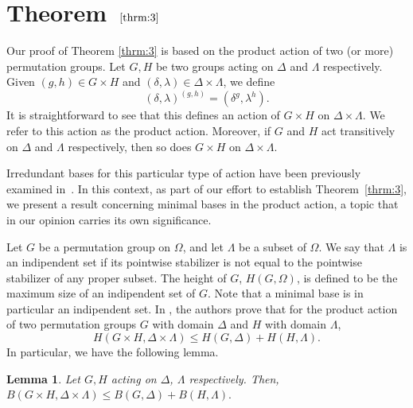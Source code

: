 \documentclass{amsart}
\newtheorem{lemma}[theorem]{Lemma}
\begin{document}
	\section{Theorem~$\ref{thrm:3}$} \label{SectionThmMinBase}
	Our proof of Theorem \ref{thrm:3} is based on the product action of two (or more) permutation groups. 
	Let $G, H$ be two groups acting on $\Delta$ and $\Lambda$ respectively. Given $(g,h) \in G \times H$ and $(\delta, \lambda) \in \Delta \times \Lambda$, we define
	\[
		(\delta,\lambda)^{(g,h)} = (\delta^g, \lambda^h).
	\]
	It is straightforward to see that this defines an action of $G \times H$ on $\Delta \times \Lambda$. We refer to this action as the product action. Moreover, if $G$ and $H$ act transitively on $\Delta$ and $\Lambda$ respectively, then so does $G\times H$ on $\Delta \times \Lambda$. 
	
	
Irredundant bases for this particular type of action have been previously examined in~\cite{GLSp}. In this context, as part of our effort to establish Theorem~\ref{thrm:3}, we present a result concerning minimal bases in the product action, a topic that in our opinion carries its own significance.
	
	
	Let $G$ be a permutation group on $\Omega$, and let  $\Lambda$ be a subset of $\Omega$. We say that $\Lambda$ is an indipendent set if its pointwise stabilizer is not equal to the pointwise stabilizer of any proper subset. The height of $G$, $H(G,\Omega)$, is defined to be the maximum size of an indipendent set of $G$. Note that a minimal base is in particular an indipendent set. In \cite[Lemma 2.5]{GLSp}, the authors prove that for the product action of two permutation groups $G$ with domain $\Delta$ and $H$ with domain $\Lambda$, 
	\[
		H(G \times H,\Delta\times\Lambda) \leq H(G,\Delta) + H(H,\Lambda).
	\]
	In particular, we have the following lemma.
	\begin{lemma}
		Let $G,H$ acting on $\Delta$, $\Lambda$ respectively. Then,
			$B(G\times H,\Delta\times\Lambda) \leq B(G,\Delta) + B(H,\Lambda).$
	\end{lemma}
	
\end{document}
